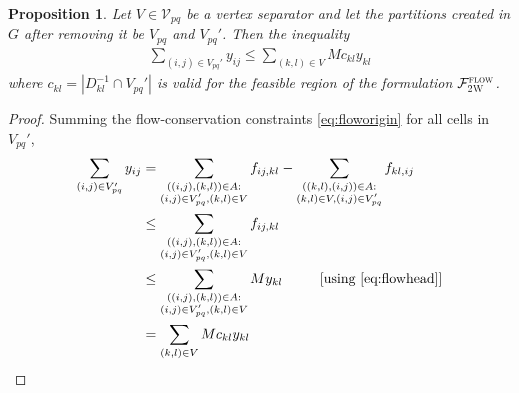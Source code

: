 \documentclass[10pt]{article}
\newcommand{\drivevar}[2]{y_{#1#2}}
\newcommand{\grid}{G}
\newcommand{\gridinvadjset}[2]{D^{-1}_{#1#2}}
\newcommand{\gridarcset}{A}
\newcommand{\entrancex}{p}
\newcommand{\entrancey}{q}
\newcommand{\vertexpartitions}[1]{\mathcal{V}_{#1}}
\newcommand{\vertexcutset}{V}
\newcommand{\twowaypartition}[1]{V_{#1}}
\newcommand{\twowaypartitioncomp}[1]{V_{#1}'}
\newtheorem{proposition}{Proposition}
\theoremstyle{definition}
\begin{document}
\begin{proposition}
\label{prop:2w_aggregate}
Let $\vertexcutset \in \vertexpartitions{pq}$ be a vertex separator and let the partitions created in $\grid$ after removing it be $\twowaypartition{\entrancex \entrancey}$ and $\twowaypartitioncomp{\entrancex \entrancey}$. Then the inequality 
\begin{align}
\sum_{(i, j) \in  \twowaypartitioncomp{\entrancex \entrancey}} \drivevar{i}{j} \leq \sum_{(k, l) \in \vertexcutset} M c_{kl} \drivevar{k}{l} \label{eq:aggregate_two_way}
\end{align}
where $c_{kl} = |\gridinvadjset{k}{l} \cap \twowaypartitioncomp{\entrancex \entrancey}|$ is valid for the feasible region of the formulation $\mathcal{F}^{\textsc{flow}}_{\textsc{2W}}$.
\end{proposition}
\begin{proof}
Summing the flow-conservation constraints \eqref{eq:floworigin} for all cells in $\twowaypartitioncomp{\entrancex \entrancey}$, 
\begin{align}
\sum_{(i,j) \in \twowaypartitioncomp{\entrancex \entrancey}} \drivevar{i}{j} & = \sum_{\substack{((i,j), (k,l)) \in \gridarcset :\\
(i,j) \in \twowaypartitioncomp{\entrancex \entrancey},
(k,l) \in \vertexcutset
}} f_{ij, kl} -
\sum_{\substack{((k,l), (i,j)) \in \gridarcset :\\
(k,l) \in \vertexcutset,
(i,j) \in \twowaypartitioncomp{\entrancex \entrancey}
}} f_{kl, ij} \notag \\
& \leq \sum_{\substack{((i,j), (k,l)) \in \gridarcset :\\
(i,j) \in \twowaypartitioncomp{\entrancex \entrancey},
(k,l) \in \vertexcutset
}} f_{ij, kl} \notag \\
& \leq \sum_{\substack{((i,j), (k,l)) \in \gridarcset :\\
(i,j) \in \twowaypartitioncomp{\entrancex \entrancey},
(k,l) \in \vertexcutset
}} M \drivevar{k}{l}  \qquad \,\,\,\,  \text{[using \eqref{eq:flowhead}]} \notag\\
& = \sum_{(k, l) \in \vertexcutset} M c_{kl} \drivevar{k}{l} \notag
\end{align}
\end{proof}
\end{document}
